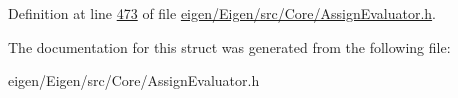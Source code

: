 Definition at line \hyperlink{eigen_2_eigen_2src_2_core_2_assign_evaluator_8h_source_l00473}{473} of file \hyperlink{eigen_2_eigen_2src_2_core_2_assign_evaluator_8h_source}{eigen/\+Eigen/src/\+Core/\+Assign\+Evaluator.\+h}.



The documentation for this struct was generated from the following file\+:\begin{DoxyCompactItemize}
\item 
eigen/\+Eigen/src/\+Core/\+Assign\+Evaluator.\+h\end{DoxyCompactItemize}

